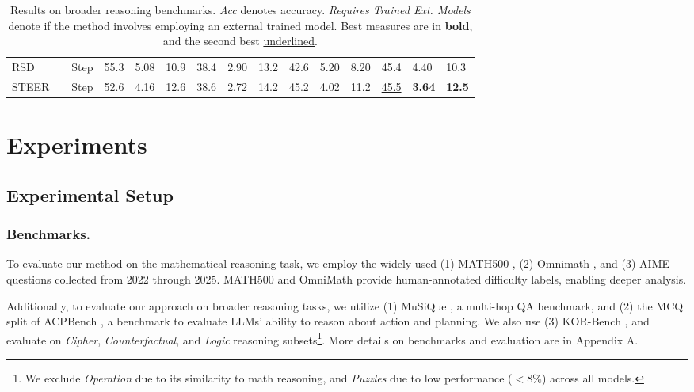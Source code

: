 \documentclass[letterpaper]{article} %
\newcommand{\cmark}{\ding{51}}  %
\newcommand{\xmark}{\ding{55}}  %
\begin{document}
\begin{table}[t]
\begin{tabularx}{\textwidth}{@{} W E E *{9}{M} | G G G @{}}
    RSD             & \hspace*{-2.3cm}\cmark & \hspace*{-1.4cm}Step
                   & 55.3 & 5.08 & 10.9 & 38.4 & 2.90 & 13.2 & 42.6 & 5.20 & 8.20 & 45.4 & 4.40 & 10.3 \\
    STEER           & \hspace*{-2.3cm}\xmark & \hspace*{-1.4cm}Step
                   & 52.6 & 4.16 & 12.6 & 38.6 & 2.72 & 14.2 & 45.2 & 4.02 & 11.2 & \underline{45.5} & \textbf{3.64} & \textbf{12.5} \\
    \bottomrule
  \end{tabularx}
  \vspace{-0.2cm}
  \caption{Results on broader reasoning benchmarks. \textit{Acc} denotes accuracy. \textit{Requires Trained Ext. Models} denote if the method involves employing an external trained model. Best measures are in \textbf{bold}, and the second best \underline{underlined}.}
  \label{tab:broad-reasoning}
  \vspace{-0.4cm}
\end{table}


\section{Experiments}
% 
% 
% 
\subsection{Experimental Setup}

\subsubsection{Benchmarks.}
To evaluate our method on the mathematical reasoning task, we employ the widely-used (1) MATH500 \citep{hendrycks2021measuringmathematicalproblemsolving,lightman2023let}, (2) Omnimath \citep{gao2024omnimathuniversalolympiadlevel}, and (3) AIME questions collected from 2022 through 2025. MATH500 and OmniMath provide human-annotated difficulty labels, enabling deeper analysis.

Additionally, to evaluate our approach on broader reasoning tasks, we utilize (1) MuSiQue \citep{trivedi2022musique}, a multi-hop QA benchmark, and (2) the MCQ split of ACPBench \citep{kokel2025acpbench}, a benchmark to evaluate LLMs' ability to reason about action and planning. We also use (3) KOR-Bench \citep{ma2025korbench}, and evaluate on  \textit{Cipher}, \textit{Counterfactual}, and \textit{Logic} reasoning subsets\footnote{We exclude \textit{Operation} due to its similarity to math reasoning, and \textit{Puzzles} due to low performance ($<8\%$) across all models.}. More details on benchmarks and evaluation are in Appendix A.
\end{document}

